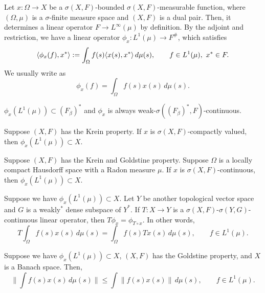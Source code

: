 \documentclass{../../small}
\begin{document}
\begin{prop}
Let $x:\Omega\to X$ be a $\sigma(X,F)$-bounded $\sigma(X,F)$-measurable function, where $(\Omega,\mu)$ is a $\sigma$-finite measure space and $(X,F)$ is a dual pair.
Then, it determines a linear operator $F\to L^\infty(\mu)$ by definition.
By the adjoint and restriction, we have a linear operator $\phi_x:L^1(\mu)\to F^\#$, which satisfies
\[\langle\phi_x(f),x^*\rangle:=\int_\Omega f(s)\langle x(s),x^*\rangle\,d\mu(s),\qquad f\in L^1(\mu),\ x^*\in F.\]
We usually write as
\[\phi_x(f)=\int_\Omega f(s)x(s)\,d\mu(s).\]
\begin{parts}
\item $\phi_x(L^1(\mu))\subset(F_\beta)^*$ and $\phi_x$ is always weak-$\sigma((F_\beta)^*,F)$-continuous.
\item Suppose $(X,F)$ has the Krein property.
If $x$ is $\sigma(X,F)$-compactly valued, then $\phi_x(L^1(\mu))\subset X$.
\item Suppose $(X,F)$ has the Krein and Goldstine property.
Suppose $\Omega$ is a locally compact Hausdorff space with a Radon measure $\mu$.
If $x$ is $\sigma(X,F)$-continuous, then $\phi_x(L^1(\mu))\subset X$.
\item Suppose we have $\phi_x(L^1(\mu))\subset X$. Let $Y$ be another topological vector space and $G$ is a weakly$^*$ dense subspace of $Y^*$. If $T:X\to Y$ is a $\sigma(X,F)$-$\sigma(Y,G)$-continuous linear operator, then $T\phi_x=\phi_{T\circ x}$. In other words,
\[T\int_\Omega f(s)x(s)\,d\mu(s)=\int_\Omega f(s)Tx(s)\,d\mu(s),\qquad f\in L^1(\mu).\]
\item Suppose we have $\phi_x(L^1(\mu))\subset X$, $(X,F)$ has the Goldstine property, and $X$ is a Banach space. Then,
\[\|\int f(s)x(s)\,d\mu(s)\|\le\int\|f(s)x(s)\|\,d\mu(s),\qquad f\in L^1(\mu).\]
\end{parts}
\end{prop}
\end{document}
